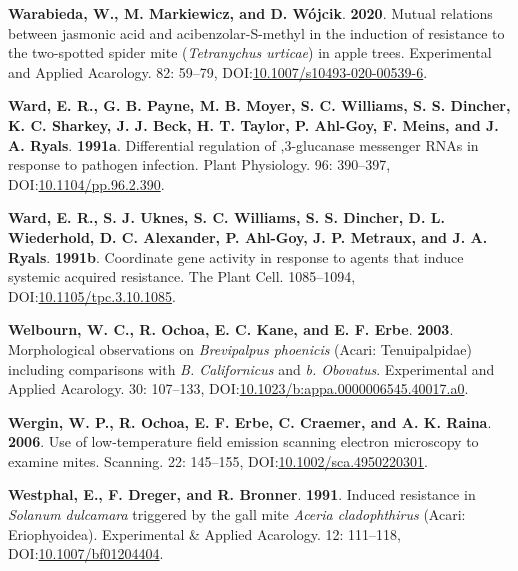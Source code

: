 \documentclass[12pt,final,CPage]{ufthesis}
\newlength{\cslhangindent}
\newenvironment{CSLReferences}[2] %
{%
	\setlength{\parindent}{0pt}
	\ifodd #1 \everypar{\setlength{\hangindent}{\cslhangindent}}\ignorespaces\fi
	\ifnum #2 > 0
	\setlength{\parskip}{#2\baselineskip}
	\fi
}%
{}
\begin{document}
{\begin{CSLReferences}{1}{0}
  \leavevmode{}%
  \textbf{Warabieda, W., M. Markiewicz, and D. Wójcik}. \textbf{2020}. Mutual relations between jasmonic acid and acibenzolar-{S}-methyl in the induction of resistance to the two-spotted spider mite ({\emph{Tetranychus urticae}}) in apple trees. Experimental and Applied Acarology. 82: 59--79, DOI:\href{https://doi.org/10.1007/s10493-020-00539-6}{10.1007/s10493-020-00539-6}.

  \leavevmode{}%
  \textbf{Ward, E. R., G. B. Payne, M. B. Moyer, S. C. Williams, S. S. Dincher, K. C. Sharkey, J. J. Beck, H. T. Taylor, P. Ahl-Goy, F. Meins, and J. A. Ryals}. \textbf{1991a}. Differential regulation of ,3-glucanase messenger {RNAs} in response to pathogen infection. Plant Physiology. 96: 390--397, DOI:\href{https://doi.org/10.1104/pp.96.2.390}{10.1104/pp.96.2.390}.

  \leavevmode{}%
  \textbf{Ward, E. R., S. J. Uknes, S. C. Williams, S. S. Dincher, D. L. Wiederhold, D. C. Alexander, P. Ahl-Goy, J. P. Metraux, and J. A. Ryals}. \textbf{1991b}. Coordinate gene activity in response to agents that induce systemic acquired resistance. The Plant Cell. 1085--1094, DOI:\href{https://doi.org/10.1105/tpc.3.10.1085}{10.1105/tpc.3.10.1085}.

  \leavevmode{}%
  \textbf{Welbourn, W. C., R. Ochoa, E. C. Kane, and E. F. Erbe}. \textbf{2003}. Morphological observations on {\emph{Brevipalpus phoenicis}} ({Acari}: {Tenuipalpidae}) including comparisons with {\emph{B. Californicus}} and {\emph{b. Obovatus}}. Experimental and Applied Acarology. 30: 107--133, DOI:\href{https://doi.org/10.1023/b:appa.0000006545.40017.a0}{10.1023/b:appa.0000006545.40017.a0}.

  \leavevmode{}%
  \textbf{Wergin, W. P., R. Ochoa, E. F. Erbe, C. Craemer, and A. K. Raina}. \textbf{2006}. Use of low-temperature field emission scanning electron microscopy to examine mites. Scanning. 22: 145--155, DOI:\href{https://doi.org/10.1002/sca.4950220301}{10.1002/sca.4950220301}.

  \leavevmode{}%
  \textbf{Westphal, E., F. Dreger, and R. Bronner}. \textbf{1991}. Induced resistance in {\emph{Solanum dulcamara}} triggered by the gall mite {\emph{Aceria cladophthirus}} ({Acari}: {Eriophyoidea}). Experimental {\&} Applied Acarology. 12: 111--118, DOI:\href{https://doi.org/10.1007/bf01204404}{10.1007/bf01204404}.


\end{CSLReferences}}
\end{document}
